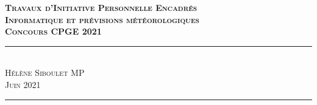 \documentclass[11pt,a4paper]{article}
\makeatletter
\renewcommand\tableofcontents{%
    \@starttoc{toc}%
}
\makeatother
\begin{document}
\begin{flushleft}
\Large \textcolor{BrickRed}{\textsc{\textbf{Travaux d'Initiative Personnelle Encadrés}}} \\
\Huge \textcolor{BrickRed}{\textsc{\textbf{Informatique et prévisions météorologiques }}} \\[0.5cm]
\Large \textcolor{BrickRed}{\textsc{\textbf{Concours CPGE 2021 \\[0.5 cm]}}}
\hrule \textcolor{White}{-} \\[0.1cm]
\Large \textsc{Hélène Siboulet MP} \\
\Large \textsc{Juin 2021} \\[0.5cm]
\hrule
\end{flushleft}
\tableofcontents
\end{document}
